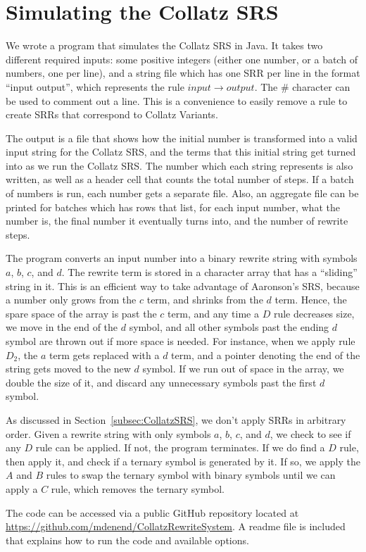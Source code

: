 \section{Simulating the Collatz SRS} \label{subsec:rewritecomp}
We wrote a program that simulates the Collatz SRS in Java. It takes two different required inputs: some positive integers (either one number, or a batch of numbers, one per line), and a string file which has one SRR per line in the format ``input output'', which represents the rule $input \rightarrow output$. The \# character can be used to comment out a line. This is a convenience to easily remove a rule to create SRRs that correspond to Collatz Variants. \par
The output is a file that shows how the initial number is transformed into a valid input string for the Collatz SRS, and the terms that this initial string get turned into as we run the Collatz SRS. The number which each string represents is also written, as well as a header cell that counts the total number of steps. If a batch of numbers is run, each number gets a separate file. Also, an aggregate file can be printed for batches which has rows that list, for each input number, what the number is, the final number it eventually turns into, and the number of rewrite steps. \par
The program converts an input number into a binary rewrite string with symbols $a$, $b$, $c$, and $d$. The rewrite term is stored in a character array that has a ``sliding'' string in it. This is an efficient way to take advantage of Aaronson's SRS, because a number only grows from the $c$ term, and shrinks from the $d$ term. Hence, the spare space of the array is past the $c$ term, and any time a $D$ rule decreases size, we move in the end of the $d$ symbol, and all other symbols past the ending $d$ symbol are thrown out if more space is needed. For instance, when we apply rule $D_2$, the $a$ term gets replaced with a $d$ term, and a pointer denoting the end of the string gets moved to the new $d$ symbol. If we run out of space in the array, we double the size of it, and discard any unnecessary symbols past the first $d$ symbol. \par
As discussed in Section~\ref{subsec:CollatzSRS}, we don't apply SRRs in arbitrary order. Given a rewrite string with only symbols $a$, $b$, $c$, and $d$, we check to see if any $D$ rule can be applied. If not, the program terminates. If we do find a $D$ rule, then apply it, and check if a ternary symbol is generated by it. If so, we apply the $A$ and $B$ rules to swap the ternary symbol with binary symbols until we can apply a $C$ rule, which removes the ternary symbol. \par
The code can be accessed via a public GitHub repository located at \url{https://github.com/mdenend/CollatzRewriteSystem}. A readme file is included that explains how to run the code and available options.


